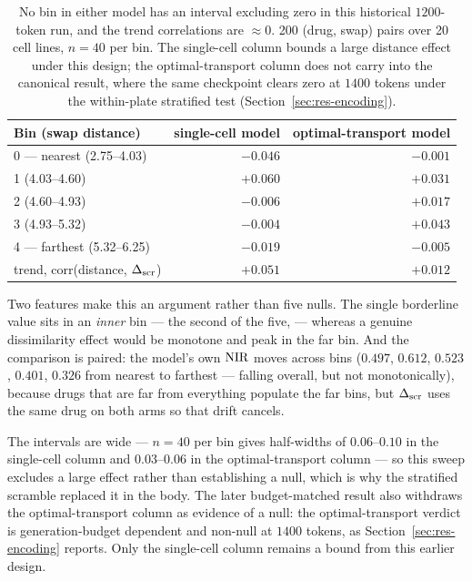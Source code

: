 \begin{table}[htbp]
\centering
\begin{tabular}{lrr}
\toprule
Bin (swap distance) & single-cell model & optimal-transport model \\
\midrule
0 --- nearest (2.75--4.03) & $-0.046$ & $-0.001$ \\
1 (4.03--4.60) & $+0.060$ & $+0.031$ \\
2 (4.60--4.93) & $-0.006$ & $+0.017$ \\
3 (4.93--5.32) & $-0.004$ & $+0.043$ \\
4 --- farthest (5.32--6.25) & $-0.019$ & $-0.005$ \\
\midrule
trend, corr(distance, $\Delta_{\textrm{scr}}$) & $+0.051$ & $+0.012$ \\
\bottomrule
\end{tabular}
\caption{No bin in either model has an interval excluding zero in this historical $1200$-token run,
and the trend correlations are $\approx 0$. 200 (drug, swap) pairs over 20 cell lines, $n=40$ per
bin. The single-cell column bounds a large distance effect under this design; the
optimal-transport column does not carry into the canonical result, where the same checkpoint clears
zero at $1400$ tokens under the within-plate stratified test
(Section~\ref{sec:res-encoding}).}
\label{tab:sweep}
\end{table}

Two features make this an argument rather than five nulls. The single borderline value sits in an
\emph{inner} bin --- the second of the five,  --- whereas a genuine
dissimilarity effect would be monotone and peak in the far bin. And the comparison is paired: the
model's own $\textrm{NIR}$ moves across bins ($0.497$, $0.612$, $0.523$, $0.401$, $0.326$ from nearest to
farthest --- falling overall, but not monotonically), because drugs that are far from everything
populate the far bins, but $\Delta_{\textrm{scr}}$ uses the same drug on both arms so that drift cancels.

The intervals are wide --- $n=40$ per bin gives half-widths of $0.06$--$0.10$ in the
single-cell column and $0.03$--$0.06$ in the optimal-transport column --- so this sweep
excludes a large effect rather than establishing a null, which is why the stratified scramble
replaced it in the body. The later budget-matched result also withdraws the optimal-transport
column as evidence of a null: the optimal-transport verdict is generation-budget dependent and
non-null at $1400$ tokens, as Section~\ref{sec:res-encoding} reports. Only the single-cell column
remains a bound from this earlier design.

